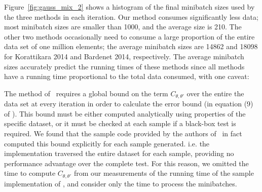 \documentclass{article}
\begin{document}
Figure~\ref{fig:gauss_mix_2} shows a histogram of the final minibatch sizes used
by the three methods in each iteration. Our method consumes significantly less
data; most minibatch sizes are smaller than 1000, and the average size is 210.
The other two methods occasionally need to consume a large proportion of the
entire data set of one million elements; the average minibatch sizes are 14862
and 18098 for Korattikara 2014 and Bardenet 2014, respectively. The average
minibatch sizes accurately predict the running times of these methods since
all methods have a running time proportional to the total data consumed, with
one caveat:


The method of~\cite{icml2014c1_bardenet14} requires a global bound on
the term $C_{\theta,\theta'}$ over the entire the data set at every
iteration in order to calculate the error bound (in equation (9) of
\cite{icml2014c1_bardenet14}).  This bound must be either computed
analytically using properties of the specific dataset, or it must be
checked at each sample if a black-box test is required. We found that
the sample code provided by the authors
of~\cite{icml2014c1_bardenet14} in fact computed this bound explicitly
for each sample generated. i.e. the implementation traversed the
entire dataset for each sample, providing no performance advantage
over the complete test. For this reason, we omitted the time to
compute $C_{\theta,\theta'}$ from our measurements of the running time
of the sample implementation of \cite{icml2014c1_bardenet14}, and
consider only the time to process the minibatches.


\end{document}
